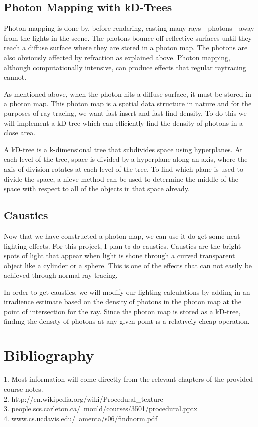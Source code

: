\documentclass {article}
\begin{document}
\subsection{Photon Mapping with kD-Trees}
Photon mapping is done by, before rendering, casting many rays---photons---away
from the lights in the scene.  The photons bounce off reflective surfaces until
they reach a diffuse surface where they are stored in a photon map.  The photons
are also obviously affected by refraction as explained above.  Photon
mapping, although computationally intensive, can produce effects that regular
raytracing cannot.

As mentioned above, when the photon hits a diffuse surface, it must be stored in
a photon map.  This photon map is a spatial data structure in nature and for the
purposes of ray tracing, we want fast insert and fast find-density.  To do this
we will implement a kD-tree which can efficiently find the density of photons in
a close area.

A kD-tree is a k-dimensional tree that subdivides space using hyperplanes.  At
each level of the tree, space is divided by a hyperplane along an axis, where
the axis of division rotates at each level of the tree.  To find which plane is
used to divide the space, a nieve method can be used to determine the middle of
the space with respect to all of the objects in that space already.

\subsection{Caustics}
Now that we have constructed a photon map, we can use it do get some neat
lighting effects.  For this project, I plan to do caustics.  Caustics are the
bright spots of light that appear when light is shone through a curved
transparent object like a cylinder or a sphere.  This is one of the effects that
can not easily be achieved through normal ray tracing.

In order to get caustics, we will modify our lighting calculations by adding in
an irradience estimate based on the density of photons in the photon map at the
point of intersection for the ray.  Since the photon map is stored as a kD-tree,
finding the density of photons at any given point is a relatively cheap
operation.

\section{Bibliography}
        1. Most information will come directly from the relevant chapters of the
        provided course notes.\\
        2. http://en.wikipedia.org/wiki/Procedural\_texture\\
        3. people.scs.carleton.ca/~mould/courses/3501/procedural.pptx\\
        4. www.cs.ucdavis.edu/~amenta/s06/findnorm.pdf\\
\end{document}
